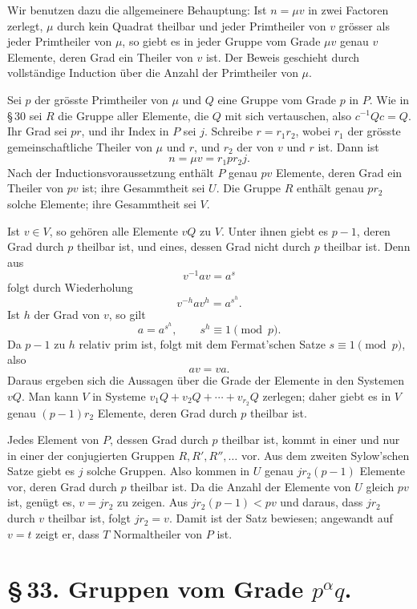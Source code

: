 \documentclass[11pt]{article}
\begin{document}
Wir benutzen dazu die allgemeinere Behauptung: Ist $n=\mu v$ in zwei Factoren zerlegt, $\mu$ durch kein Quadrat theilbar und jeder Primtheiler von $v$ grösser als jeder Primtheiler von $\mu$, so giebt es in jeder Gruppe vom Grade $\mu v$ genau $v$ Elemente, deren Grad ein Theiler von $v$ ist. Der Beweis geschieht durch vollständige Induction über die Anzahl der Primtheiler von $\mu$.

Sei $p$ der grösste Primtheiler von $\mu$ und $Q$ eine Gruppe vom Grade $p$ in $P$. Wie in \S\,30 sei $R$ die Gruppe aller Elemente, die $Q$ mit sich vertauschen, also $c^{-1}Qc=Q$. Ihr Grad sei $pr$, und ihr Index in $P$ sei $j$. Schreibe $r=r_1r_2$, wobei $r_1$ der grösste gemeinschaftliche Theiler von $\mu$ und $r$, und $r_2$ der von $v$ und $r$ ist. Dann ist
\[
n=\mu v=r_1 p r_2 j.
\]
Nach der Inductionsvoraussetzung enthält $P$ genau $pv$ Elemente, deren Grad ein Theiler von $pv$ ist; ihre Gesammtheit sei $U$. Die Gruppe $R$ enthält genau $pr_2$ solche Elemente; ihre Gesammtheit sei $V$.

Ist $v\in V$, so gehören alle Elemente $vQ$ zu $V$. Unter ihnen giebt es $p-1$, deren Grad durch $p$ theilbar ist, und eines, dessen Grad nicht durch $p$ theilbar ist. Denn aus
\[
v^{-1}av=a^s
\tag{1}
\]
folgt durch Wiederholung
\[
v^{-h}av^h=a^{s^h}.
\tag{2}
\]
Ist $h$ der Grad von $v$, so gilt
\[
a=a^{s^h},\qquad s^h\equiv1\pmod p.
\tag{3}
\]
Da $p-1$ zu $h$ relativ prim ist, folgt mit dem Fermat'schen Satze $s\equiv1\pmod p$, also
\[
av=va.
\tag{6}
\]
Daraus ergeben sich die Aussagen über die Grade der Elemente in den Systemen $vQ$. Man kann $V$ in Systeme $v_1Q+v_2Q+\cdots+v_{r_2}Q$ zerlegen; daher giebt es in $V$ genau $(p-1)r_2$ Elemente, deren Grad durch $p$ theilbar ist.

Jedes Element von $P$, dessen Grad durch $p$ theilbar ist, kommt in einer und nur in einer der conjugierten Gruppen $R,R',R'',\ldots$ vor. Aus dem zweiten Sylow'schen Satze giebt es $j$ solche Gruppen. Also kommen in $U$ genau $jr_2(p-1)$ Elemente vor, deren Grad durch $p$ theilbar ist. Da die Anzahl der Elemente von $U$ gleich $pv$ ist, genügt es, $v=jr_2$ zu zeigen. Aus $jr_2(p-1)<pv$ und daraus, dass $jr_2$ durch $v$ theilbar ist, folgt $jr_2=v$. Damit ist der Satz bewiesen; angewandt auf $v=t$ zeigt er, dass $T$ Normaltheiler von $P$ ist.

\section*{\S\,33. Gruppen vom Grade $p^\alpha q$.}
\end{document}
